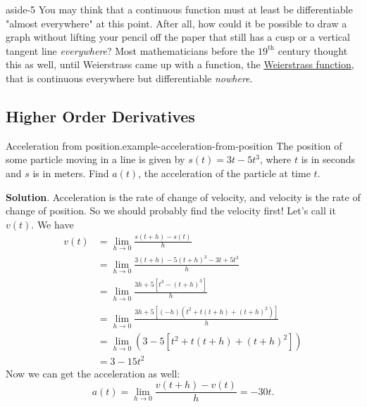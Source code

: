 \documentclass[10pt,]{book}
\numberwithin{equation}{section}
\begin{document}
\begin{aside}{}{aside-5}%
\hypertarget{p-115}{}%
You may think that a continuous function must at least be differentiable "almost everywhere" at this point. After all, how could it be possible to draw a graph without lifting your pencil off the paper that still has a cusp or a vertical tangent line \emph{everywhere}? Most mathematicians before the \(19^{\text{th}}\) century thought this as well, until Weierstrass came up with a function, the \href{https://en.wikipedia.org/wiki/Weierstrass_function}{Weierstrass function}, that is continuous everywhere but differentiable \emph{nowhere}.%
\end{aside}
%
%
\typeout{************************************************}
\typeout{************************************************}
%
\subsection[{Higher Order Derivatives}]{Higher Order Derivatives}\label{subsection-higher-order-derivatives}
\begin{example}{Acceleration from position.}{example-acceleration-from-position}%
\hypertarget{p-116}{}%
The position of some particle moving in a line is given by \(s(t) = 3t-5t^{3}\), where \(t\) is in seconds and \(s\) is in meters. Find \(a(t)\), the acceleration of the particle at time \(t\).%
\par\smallskip%
\noindent\textbf{Solution}.\hypertarget{solution-25}{}\quad%
\hypertarget{p-117}{}%
Acceleration is the rate of change of velocity, and velocity is the rate of change of position. So we should probably find the velocity first! Let's call it \(v(t)\). We have%
\begin{align*}
v(t) & = \lim_{h\to0}\frac{s(t+h) - s(t)}{h} \\
& = \lim_{h\to0}\frac{3(t+h) - 5(t+h)^{3} - 3t + 5t^{3}}{h} \\
& = \lim_{h\to0}\frac{3h + 5[t^{3} - (t+h)^{3}]}{h} \\
& = \lim_{h\to0}\frac{3h + 5[(-h)(t^{2} + t(t+h) + (t+h)^{2})]}{h} \\
& = \lim_{h\to0}(3 - 5[t^{2} + t(t+h) + (t+h)^{2}]) \\
& = 3 - 15t^{2} 
\end{align*}
Now we can get the acceleration as well:%
\begin{equation*}
a(t) = \lim_{h\to0}\frac{v(t+h) - v(t)}{h} = -30t.
\end{equation*}
%
\end{example}
\end{document}
